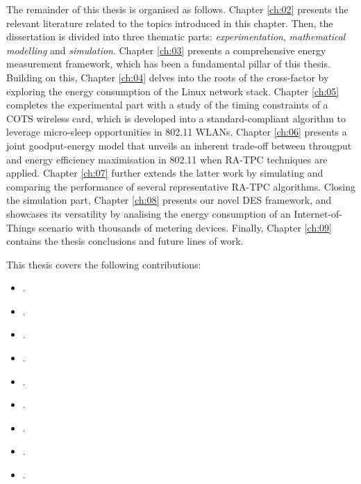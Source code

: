 \documentclass[twoside,nohyper]{tufte-book}
\providecommand{\tightlist}{%
  \setlength{\itemsep}{0pt}\setlength{\parskip}{0pt}}
\theoremstyle{definition}
\theoremstyle{definition}
\theoremstyle{definition}
\theoremstyle{remark}
\begin{document}
The remainder of this thesis is organised as follows. Chapter
\ref{ch:02} presents the relevant literature related to the topics
introduced in this chapter. Then, the dissertation is divided into three
thematic parts: \emph{experimentation}, \emph{mathematical modelling}
and \emph{simulation}. Chapter \ref{ch:03} presents a comprehensive
energy measurement framework, which has been a fundamental pillar of
this thesis. Building on this, Chapter \ref{ch:04} delves into the roots
of the cross-factor by exploring the energy consumption of the Linux
network stack. Chapter \ref{ch:05} completes the experimental part with
a study of the timing constraints of a COTS wireless card, which is
developed into a standard-compliant algorithm to leverage micro-sleep
opportunities in 802.11 WLANs. Chapter \ref{ch:06} presents a joint
goodput-energy model that unveils an inherent trade-off between
througput and energy efficiency maximisation in 802.11 when RA-TPC
techniques are applied. Chapter \ref{ch:07} further extends the latter
work by simulating and comparing the performance of several
representative RA-TPC algorithms. Closing the simulation part, Chapter
\ref{ch:08} presents our novel DES framework, and showcases its
versatility by analising the energy consumption of an Internet-of-Things
scenario with thousands of metering devices. Finally, Chapter
\ref{ch:09} contains the thesis conclusions and future lines of work.

This thesis covers the following contributions:\vspace{-1mm}

\par

\relax

\begin{itemize}
\tightlist
\item
  .\vspace{8pt}
\item
  .
\item
  .\vspace{8pt}
\item
  .
\item
  .\vspace{8pt}
\item
  .\vspace{8pt}
\item
  .\vspace{8pt}
\item
  .
\item
  .
\end{itemize}
\end{document}
